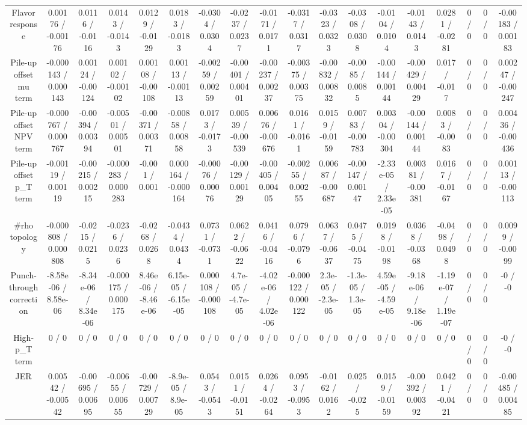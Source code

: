 \documentclass[10pt]{article}
\begin{document}
\begin{table}[htbp]
\begin{center}
\begin{tabular}{|c|c|c|c|c|c|c|c|c|c|c|c|c|c|c|c|c|c|}
  Flavor response & 0.00176 / -0.00176 & 0.0116 / -0.0116 & 0.0143 / -0.0143 & 0.0129 / -0.0129 & 0.0183 / -0.0183 & -0.0304 / 0.0304 & -0.0237 / 0.0237 & -0.0171 / 0.0171 & -0.0317 / 0.0317 & -0.0323 / 0.0323 & -0.0308 / 0.0308 & -0.0104 / 0.0104 & -0.0143 / 0.0143 & 0.0281 / -0.0281 & 0 / 0 & 0 / 0 & -0.00183 / 0.00183 \\ 
  Pile-up offset mu term & -0.000143 / 0.000143 & 0.00124 / -0.00124 & 0.00102 / -0.00102 & 0.00108 / -0.00108 & 0.00113 / -0.00113 & -0.00259 / 0.00259 & -0.00401 / 0.00401 & -0.00237 / 0.00237 & -0.00375 / 0.00375 & -0.00832 / 0.00832 & -0.0085 / 0.0085 & -0.00144 / 0.00144 & -0.00429 / 0.00429 & 0.017 / -0.017 & 0 / 0 & 0 / 0 & 0.00247 / -0.00247 \\ 
  Pile-up offset NPV term & -0.000767 / 0.000767 & -0.00394 / 0.00394 & -0.00501 / 0.00501 & -0.00371 / 0.00371 & -0.00858 / 0.00858 & 0.0173 / -0.0173 & 0.00539 / -0.00539 & 0.00676 / -0.00676 & 0.0161 / -0.0161 & 0.0159 / -0.0159 & 0.00783 / -0.00783 & 0.00304 / -0.00304 & -0.00144 / 0.00144 & 0.0083 / -0.0083 & 0 / 0 & 0 / 0 & 0.00436 / -0.00436 \\ 
  Pile-up offset p_{T} term & -0.00119 / 0.00119 & -0.00215 / 0.00215 & -0.000283 / 0.000283 & -0.001 / 0.001 & 0.000164 / -0.000164 & -0.00076 / 0.00076 & -0.00129 / 0.00129 & -0.00405 / 0.00405 & -0.00255 / 0.00255 & 0.00687 / -0.00687 & -0.00147 / 0.00147 & -2.33e-05 / 2.33e-05 & 0.00381 / -0.00381 & 0.0167 / -0.0167 & 0 / 0 & 0 / 0 & 0.00113 / -0.00113 \\ 
  #rho topology & -0.000808 / 0.000808 & -0.0215 / 0.0215 & -0.0236 / 0.0236 & -0.0268 / 0.0268 & -0.0434 / 0.0434 & 0.0731 / -0.0731 & 0.0622 / -0.0622 & 0.0416 / -0.0416 & 0.0796 / -0.0796 & 0.0637 / -0.0637 & 0.0475 / -0.0475 & 0.0198 / -0.0198 & 0.0368 / -0.0368 & -0.0498 / 0.0498 & 0 / 0 & 0 / 0 & 0.0099 / -0.0099 \\ 
  Punch-through correction & -8.58e-06 / 8.58e-06 & -8.34e-06 / 8.34e-06 & -0.000175 / 0.000175 & 8.46e-06 / -8.46e-06 & 6.15e-05 / -6.15e-05 & 0.000108 / -0.000108 & 4.7e-05 / -4.7e-05 & -4.02e-06 / 4.02e-06 & -0.000122 / 0.000122 & 2.3e-05 / -2.3e-05 & -1.3e-05 / 1.3e-05 & 4.59e-05 / -4.59e-05 & -9.18e-06 / 9.18e-06 & -1.19e-07 / 1.19e-07 & 0 / 0 & 0 / 0 & -0 / -0 \\ 
  High-p_{T} term & 0 / 0 & 0 / 0 & 0 / 0 & 0 / 0 & 0 / 0 & 0 / 0 & 0 / 0 & 0 / 0 & 0 / 0 & 0 / 0 & 0 / 0 & 0 / 0 & 0 / 0 & 0 / 0 & 0 / 0 & 0 / 0 & -0 / -0 \\ 
  JER & 0.00542 / -0.00542 & -0.00695 / 0.00695 & -0.00655 / 0.00655 & -0.00729 / 0.00729 & -8.9e-05 / 8.9e-05 & 0.0543 / -0.0543 & 0.0151 / -0.0151 & 0.0264 / -0.0264 & 0.0953 / -0.0953 & -0.0162 / 0.0162 & 0.025 / -0.025 & 0.0159 / -0.0159 & -0.00392 / 0.00392 & 0.0421 / -0.0421 & 0 / 0 & 0 / 0 & -0.00485 / 0.00485 \\ 

\end{tabular}
\end{center}
\end{table}
\end{document}
